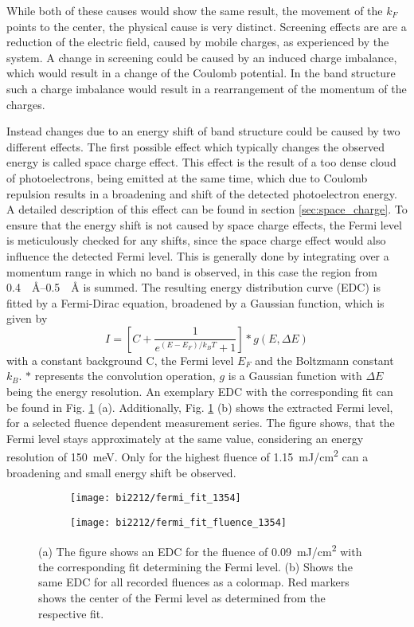 While both of these causes would show the same result, the movement of the $k_F$ points to the center, the physical cause is very distinct.
Screening effects are are a reduction of the electric field, caused by mobile charges, as experienced by the system.
A change in screening could be caused by an induced charge imbalance, which would result in a change of the Coulomb potential.
In the band structure such a charge imbalance would result in a rearrangement of the momentum of the charges.

Instead changes due to an energy shift of band structure could be caused by two different effects.
The first possible effect which typically changes the observed energy is called space charge effect.
This effect is the result of a too dense cloud of photoelectrons, being emitted at the same time, which due to Coulomb repulsion results in a broadening and shift of the detected photoelectron energy.
A detailed description of this effect can be found in section \ref{sec:space_charge}.
To ensure that the energy shift is not caused by space charge effects, the Fermi level is meticulously checked for any shifts, since the space charge effect would also influence the detected Fermi level.
This is generally done by integrating over a momentum range in which no band is observed, in this case the region from \qtyrange{0.4}{0.5}{\per\angstrom} is summed.
The resulting energy distribution curve (EDC) is fitted by a Fermi-Dirac equation, broadened by a Gaussian function, which is given by
\begin{equation}
	I = \left[ C + \frac{1}{e^{(E-E_F)/k_BT}+1} \right] * g(E,\Delta E)
\end{equation}
with a constant background C, the Fermi level $E_F$ and the Boltzmann constant $k_B$.
$*$ represents the convolution operation, $g$ is a Gaussian function with $\Delta E$ being the energy resolution.
An exemplary EDC with the corresponding fit can be found in Fig. \ref{fig:fermi_fit_bi2212} (a).
Additionally, Fig. \ref{fig:fermi_fit_bi2212} (b) shows the extracted Fermi level, for a selected fluence dependent measurement series.
The figure shows, that the Fermi level stays approximately at the same value, considering an energy resolution of \qty{150}{\milli\electronvolt}.
Only for the highest fluence of \qty{1.15}{\milli\joule/\centi\meter\squared} can a broadening and small energy shift be observed.

\begin{figure}[t]
	\centering
	\begin{subfigure}[b]{0.33\textwidth}
		\texttt{[image: bi2212/fermi\_fit\_1354]}
		\caption{}
	\end{subfigure}
	\begin{subfigure}[b]{0.33\textwidth}
		\texttt{[image: bi2212/fermi\_fit\_fluence\_1354]}
		\caption{}
	\end{subfigure}
	\caption{(a) The figure shows an EDC for the fluence of \qty{0.09}{\milli\joule/\centi\meter\squared} with the corresponding fit determining the Fermi level. (b) Shows the same EDC for all recorded fluences as a colormap. Red markers shows the center of the Fermi level as determined from the respective fit.}
	\label{fig:fermi_fit_bi2212}
\end{figure}

